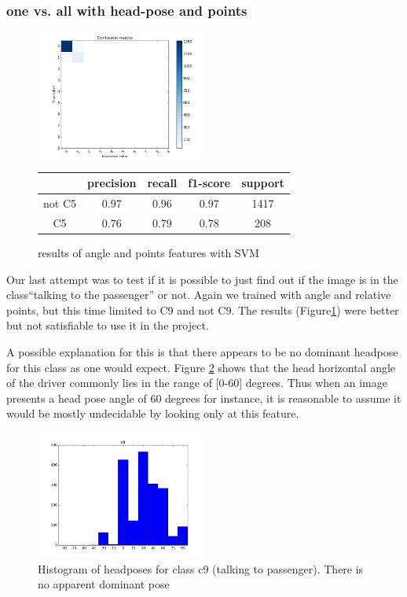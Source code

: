 \documentclass[10pt,twocolumn,letterpaper]{article}
\begin{document}
\subsubsection{one vs. all with head-pose and points}
\begin{figure}[h]
	\centering
	\includegraphics[width=0.5\textwidth]{c5ornot.png}\hspace{0.01\textwidth}
	\begin{tabular}{c||c|c|c|c}
	  & precision&recall&f1-score&support\\	\hline
	  not C5&0.97&0.96&0.97&1417\\
	  C5&0.76&0.79&0.78&208
	\end{tabular}
	\caption{results of angle and points features with SVM}
	\label{C5ornot}
	\end{figure}

Our last attempt was to test if it is possible to just find out if the image is in the class``talking to the passenger'' or not. Again we trained with angle and relative points, but this time limited to C9 and not C9. The results (Figure\ref{C5ornot}) were better but not satisfiable to use it in the project.

A possible explanation for this is that there appears to be no dominant headpose for this class as one would expect. Figure \ref{headpose_histogram_c9} shows that the head horizontal angle of the driver commonly lies in the range of [0-60] degrees. Thus when an image presents a head pose angle of 60 degrees for instance, it is reasonable to assume it would be mostly undecidable by looking only at this feature.

\begin{figure}[h]
	\centering
	\includegraphics[width=0.5\textwidth]{headpose_evaluation_c9}
	\caption{Histogram of headposes for class c9 (talking to passenger). There is no apparent dominant pose}
	\label{headpose_histogram_c9}
\end{figure}
\end{document}
